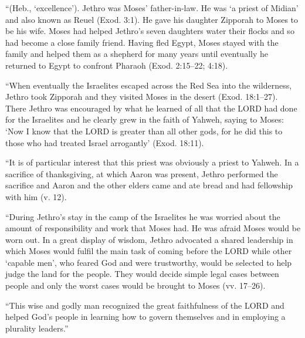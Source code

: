 			``(Heb., `excellence'). Jethro was Moses' father-in-law. He was `a priest of Midian' and also known as Reuel (Exod. 3:1). He gave his daughter Zipporah to Moses to be his wife. Moses had helped Jethro's seven daughters water their flocks and so had become a close family friend. Having fled Egypt, Moses stayed with the family and helped them as a shepherd for many years until eventually he returned to Egypt to confront Pharaoh (Exod. 2:15--22; 4:18).

			``When eventually the Israelites escaped across the Red Sea into the wilderness, Jethro took Zipporah and they visited Moses in the desert (Exod. 18:1--27). There Jethro was encouraged by what he learned of all that the LORD had done for the Israelites and he clearly grew in the faith of Yahweh, saying to Moses: `Now I know that the LORD is greater than all other gods, for he did this to those who had treated Israel arrogantly' (Exod. 18:11).

			``It is of particular interest that this priest was obviously a priest to Yahweh. In a sacrifice of thanksgiving, at which Aaron was present, Jethro performed the sacrifice and Aaron and the other elders came and ate bread and had fellowship with him (v. 12).

			``During Jethro's stay in the camp of the Israelites he was worried about the amount of responsibility and work that Moses had. He was afraid Moses would be worn out. In a great display of wisdom, Jethro advocated a shared leadership in which Moses would fulfil the main task of coming before the LORD while other `capable men', who feared God and were trustworthy, would be selected to help judge the land for the people. They would decide simple legal cases between people and only the worst cases would be brought to Moses (vv. 17--26).

			``This wise and godly man recognized the great faithfulness of the LORD and helped God's people in learning how to govern themselves and in employing a plurality leaders.''



